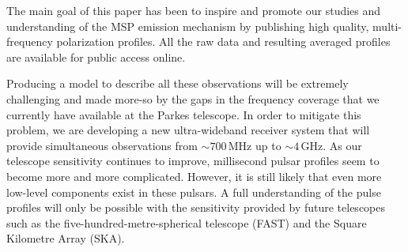 \documentclass[useAMS,usenatbib]{mn2e}
\begin{document}
\begin{itemize}
\end{itemize}

%
The main goal of this paper has been to inspire and promote our studies and understanding 
of the MSP emission mechanism by publishing high quality, multi-frequency 
polarization profiles.
%
All the raw data and resulting averaged profiles are available for 
public access online.
%

Producing a model to describe all these observations will be extremely 
challenging and made more-so by the gaps in the frequency coverage that we 
currently have available at the Parkes telescope.  
%
In order to mitigate this problem, we are developing a new ultra-wideband 
receiver system that will provide simultaneous observations from $\sim700$\,MHz 
up to $\sim4$\,GHz.  
%
As our telescope sensitivity continues to improve, millisecond pulsar profiles seem to become more and more complicated. However, it is still likely that even more low-level components exist in these pulsars. A full understanding of the pulse profiles will only be possible with 
the sensitivity provided by future telescopes such as the five-hundred-metre-spherical 
telescope (FAST) and the Square Kilometre Array (SKA).


%
\end{document}
